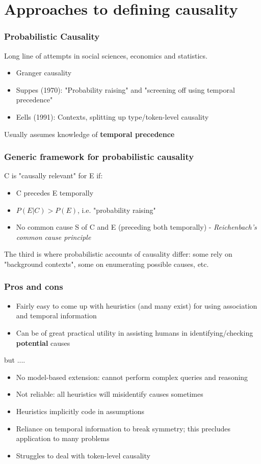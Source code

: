 \documentclass[handout]{beamer}
\begin{document}
\section{Approaches to defining causality}
\begin{frame}
\frametitle{Probabilistic Causality}
Long line of attempts in social sciences, economics and statistics.
\pause
\begin{itemize}
	\item Granger causality
	\pause
	\item Suppes (1970): "Probability raising" and "screening off using temporal precedence"
	\pause
	\item Eells (1991): Contexts, splitting up type/token-level causality
\end{itemize}
\pause
Usually assumes knowledge of \textbf{temporal precedence}
\end{frame}

\begin{frame}
\frametitle{Generic framework for probabilistic causality}
C is "causally relevant" for E if:
\pause
\begin{itemize}
	\item C precedes E temporally
	\pause
	\item $P(E|C) > P(E)$, i.e. "probability raising"
	\pause
	\item No common cause S of C and E (preceding both temporally) - \textit{Reichenbach's common cause principle}
\end{itemize}
\pause
The third is where probabilistic accounts of causality differ: some rely on "background contexts", some on enumerating possible causes, etc.
\end{frame}

\begin{frame}
\frametitle{Pros and cons}
\begin{itemize}
\pause
\item Fairly easy to come up with heuristics (and many exist) for using association and temporal information
\pause
\item Can be of great practical utility in assisting humans in identifying/checking \textbf{potential} causes
\pause
\end{itemize}

but ....
\pause
\begin{itemize}
\item No model-based extension: cannot perform complex queries and reasoning
\pause
\item Not reliable: all heuristics will misidentify causes sometimes
\pause
\item Heuristics implicitly code in assumptions
\pause
\item Reliance on temporal information to break symmetry; this precludes application to many problems
\pause
\item Struggles to deal with token-level causality
\end{itemize}

\end{frame}
\end{document}
